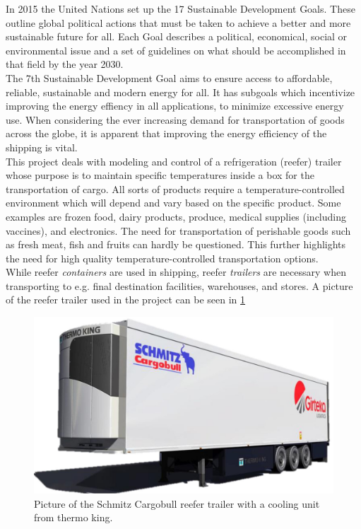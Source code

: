 In 2015 the United Nations set up the 17 Sustainable Development Goals. These outline global political actions that must be taken to achieve a better and more sustainable future for all. Each Goal describes a political, economical, social or environmental issue and a set of guidelines on what should be accomplished in that field by the year 2030.\\

The 7th Sustainable Development Goal aims to ensure access to affordable, reliable, sustainable and modern energy for all. It has subgoals which incentivize improving the energy effiency in all applications, to minimize excessive energy use. When considering the ever increasing demand for transportation of goods across the globe, it is apparent that improving the energy efficiency of the shipping is vital.\\

This project deals with modeling and control of a refrigeration (reefer) trailer whose purpose is to maintain specific temperatures inside a box for the transportation of cargo. All sorts of products require a temperature-controlled environment which will depend and vary based on the specific product. Some examples are frozen food, dairy products, produce, medical supplies (including vaccines), and electronics. The need for transportation of perishable goods such as fresh meat, fish and fruits can hardly be questioned. This further highlights the need for high quality temperature-controlled transportation options. \\

While reefer \textit{containers} are used in shipping, reefer \textit{trailers} are necessary when transporting to e.g. final destination facilities, warehouses, and stores. A picture of the reefer trailer used in the project can be seen in \cref{fig:trailer_picture}

\begin{figure}[h]
	\centering
	\includegraphics[width = 0.55\linewidth]{Graphics/3d_draw_trailer.jpg}
	\caption{Picture of the Schmitz Cargobull reefer trailer with a cooling unit from thermo king.}
	\label{fig:trailer_picture}
\end{figure}

